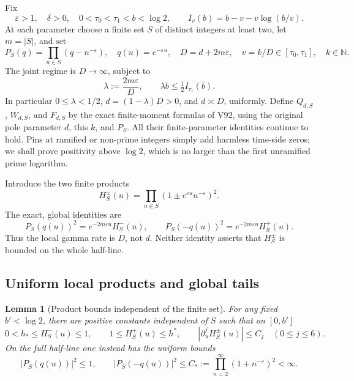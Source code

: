 \documentclass[11pt]{article}
\newtheorem{lemma}[theorem]{Lemma}
\theoremstyle{definition}
\theoremstyle{remark}
\begin{document}
Fix
\begin{equation}
 \varepsilon>1,\quad \delta>0,\quad
 0<\tau_0<\tau_1<b<\log2,
 \qquad I_v(b)=b-v-v\log(b/v).
 \label{eq:f2v93-fixed}
\end{equation}
At each parameter choose a finite set \(S\) of distinct integers
at least two, let \(m=|S|\), and set
\begin{equation}
 P_S(q)=\prod_{n\in S}(q-n^{-\varepsilon}),\quad
 q(u)=e^{-\varepsilon u},\quad
 D=d+2m\varepsilon,\quad v=k/D\in[\tau_0,\tau_1],
 \quad k\in\mathbb N.
 \label{eq:f2v93-effective}
\end{equation}
The joint regime is \(D\to\infty\), subject to
\begin{equation}
 \lambda:=\frac{2m\varepsilon}{D},\qquad
 \lambda b\le\tfrac12 I_{\tau_1}(b).
 \label{eq:f2v93-load}
\end{equation}
In particular \(0\le\lambda<1/2\), \(d=(1-\lambda)D>0\),
and \(d\asymp D\), uniformly.  Define \(Q_{d,S}\), \(W_{d,S}\),
and \(F_{d,S}\) by the exact finite-moment formulas of V92, using
the original pole parameter \(d\), this \(k\), and \(P_S\).
All their finite-parameter identities continue to hold.  Pins at
ramified or non-prime integers simply add harmless time-side zeros;
we shall prove positivity above \(\log2\), which is no larger than
the first unramified prime logarithm.

Introduce the two finite products
\begin{equation}
 H_S^\pm(u)=\prod_{n\in S}(1\pm e^{\varepsilon u}n^{-\varepsilon})^2.
 \label{eq:f2v93-products}
\end{equation}
The exact, global identities are
\begin{equation}
 P_S(q(u))^2=e^{-2m\varepsilon u}H_S^-(u),\qquad
 P_S(-q(u))^2=e^{-2m\varepsilon u}H_S^+(u).
 \label{eq:f2v93-factorization}
\end{equation}
Thus the local gamma rate is \(D\), not \(d\).  Neither identity
asserts that \(H_S^\pm\) is bounded on the whole half-line.

\subsection{Uniform local products and global tails}

\begin{lemma}[Product bounds independent of the finite set]
\label{lem:f2v93-products}
For any fixed \(b'<\log2\), there are positive constants independent
of \(S\) such that on \([0,b']\)
\begin{equation}
 0<h_*\le H_S^-(u)\le1,\qquad
 1\le H_S^+(u)\le h^*,\qquad
 |\partial_u^jH_S^\pm(u)|\le C_j\quad(0\le j\le6).
 \label{eq:f2v93-product-bounds}
\end{equation}
On the full half-line one instead has the uniform bounds
\begin{equation}
 |P_S(q(u))|^2\le1,\qquad
 |P_S(-q(u))|^2\le
 C_*:=\prod_{n=2}^{\infty}(1+n^{-\varepsilon})^2<\infty.
 \label{eq:f2v93-global-P}
\end{equation}
\end{lemma}
\end{document}
